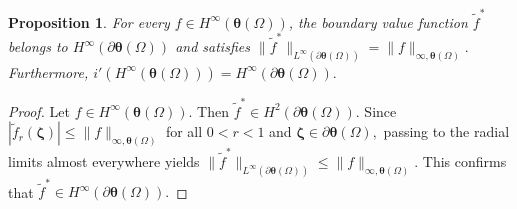 \documentclass[12pt,reqno]{amsart}
\newtheorem{proposition}[theorem]{Proposition}%
\theoremstyle{remark}
\theoremstyle{definition}
\begin{document}
\begin{proposition} \label{required result 2}
    For every $f\in H^\infty(\boldsymbol\theta(\Omega))$, the boundary value function $\tilde{f}^* $ belongs to $H^\infty(\partial\boldsymbol \theta(\Omega))$ and satisfies $\|\tilde{f}^*\|_{L^\infty(\partial\boldsymbol \theta(\Omega))}=\|f\|_{\infty, \boldsymbol\theta(\Omega)}.$ Furthermore, $i'(H^\infty(\boldsymbol \theta(\Omega)))=H^\infty(\partial\boldsymbol \theta(\Omega)).$ 
\end{proposition}
\begin{proof}
    Let $f\in H^\infty(\boldsymbol\theta(\Omega)).$ Then $\tilde{f}^* \in H^2(\partial\boldsymbol \theta(\Omega)).$ Since $|\tilde{f}_r(\boldsymbol \zeta)| \leq \|f\|_{\infty, \boldsymbol\theta(\Omega)}$ for all $0<r<1$ and $\boldsymbol \zeta \in \partial\boldsymbol \theta(\Omega),$ passing to the radial limits almost everywhere yields $\|\tilde{f}^*\|_{L^\infty(\partial\boldsymbol \theta(\Omega))} \leq \|f\|_{\infty, \boldsymbol \theta(\Omega)}.$ This confirms that $\tilde{f}^* \in H^\infty(\partial\boldsymbol \theta(\Omega)).$


\end{proof}
\end{document}
